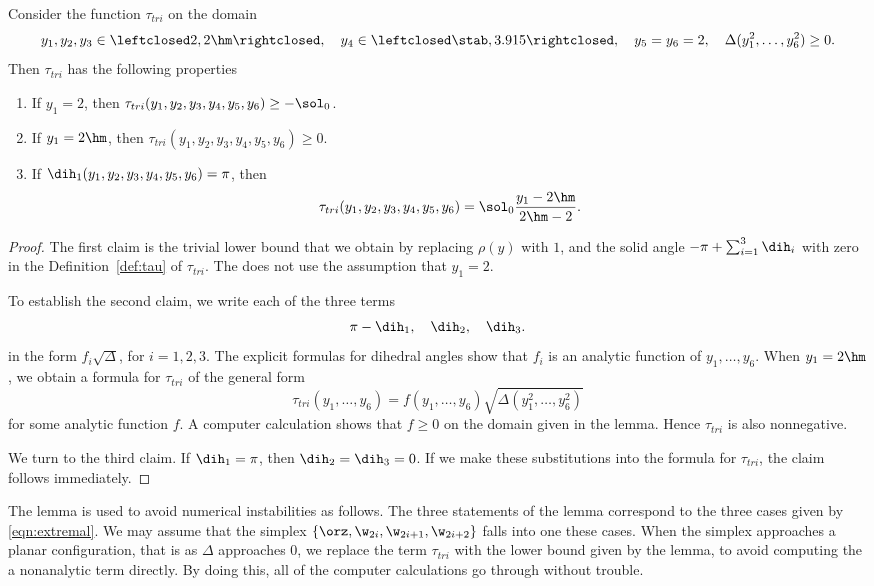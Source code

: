 \begin{lemma}
Consider the function $\tau_{tri}$
on the domain
\[
y_1,y_2,y_3\in\leftclosed 2,2\hm\rightclosed,
\quad y_4\in\leftclosed \stab,3.915\rightclosed,
\quad y_5=y_6=2,\quad
\Delta(y_1^2,\ldots,y_6^2)\ge0.
\]
Then $\tau_{tri}$ has the following properties
\begin{enumerate}
\item If $y_1=2$, then $\tau_{tri}(y_1,y_2,y_3,y_4,y_5,y_6)\ge -\sol_0$.
\item If $y_1=2\hm$, then $\tau_{tri}(y_1,y_2,y_3,y_4,y_5,y_6)\ge 0$.
\item If $\dih_1(y_1,y_2,y_3,y_4,y_5,y_6) =\pi$, then 
  \[
  \tau_{tri}(y_1,y_2,y_3,y_4,y_5,y_6) = \sol_0\dfrac{y_1 -2\hm}{2\hm-2}.
  \]
\end{enumerate}
\end{lemma}

\begin{proof}
The first claim is the trivial lower bound that we obtain by replacing
$\rho(y)$
with $1$, and the solid angle $-\pi+\sum_{i=1}^3 \dih_i$ with zero
in the Definition~\ref{def:tau} of $\tau_{tri}$.  The does not use the
assumption that $y_1=2$.

To establish the second claim, we write each of the three terms 
\[
\pi-\dih_1,\quad\dih_2,\quad \dih_3.
\]
in the form $f_i\sqrt{\Delta}$, for $i=1,2,3$.  The explicit formulas
for dihedral angles show that $f_i$ is an analytic function of
$y_1,\ldots,y_6$.  When $y_1=2\hm$, we obtain a formula for
$\tau_{tri}$ of the general form
\[
\tau_{tri}(y_1,\ldots,y_6)= f(y_1,\ldots,y_6)\sqrt{\Delta(y_1^2,\ldots,y_6^2)}
\]
for some analytic function $f$.  A computer calculation shows that $f\ge0$
on the domain given in the lemma. Hence $\tau_{tri}$ is also nonnegative.

We turn to the third claim.  If $\dih_1=\pi$, then $\dih_2=\dih_3=0$.
If we make these substitutions into the formula for $\tau_{tri}$, the
claim follows immediately.
\end{proof}

The lemma is used to avoid numerical instabilities as follows.  The
three statements of the lemma correspond to the three cases given by
\eqref{eqn:extremal}.  We may assume that the simplex
$\{\orz,\w_{2i},\w_{2i+1},\w_{2i+2}\}$ falls into one these cases.
When the simplex approaches a planar configuration, that is as
$\Delta$ approaches $0$, we replace the term $\tau_{tri}$ with the
lower bound given by the lemma, to avoid computing the a nonanalytic
term directly.  By doing this, all of the computer calculations go
through without trouble.
